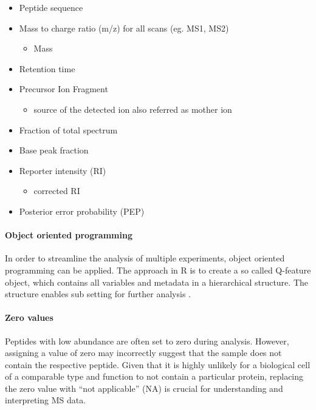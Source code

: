 \documentclass[
  11pt,
]{article}
\providecommand{\tightlist}{%
  \setlength{\itemsep}{0pt}\setlength{\parskip}{0pt}}
\begin{document}
\begin{itemize}
\tightlist
\item
  Peptide sequence
\item
  Mass to charge ratio (m/z) for all scans (eg. MS1, MS2)

  \begin{itemize}
  \tightlist
  \item
    Mass
  \end{itemize}
\item
  Retention time
\item
  Precursor Ion Fragment

  \begin{itemize}
  \tightlist
  \item
    source of the detected ion also referred as mother ion
  \end{itemize}
\item
  Fraction of total spectrum
\item
  Base peak fraction
\item
  Reporter intensity (RI)

  \begin{itemize}
  \tightlist
  \item
    corrected RI
  \end{itemize}
\item
  Posterior error probability (PEP)
\end{itemize}

\hypertarget{object-oriented-programming}{%
\paragraph{Object oriented
programming}\label{object-oriented-programming}}

In order to streamline the analysis of multiple experiments, object
oriented programming can be applied. The approach in R is to create a so
called Q-feature object, which contains all variables and metadata in a
hierarchical structure. The structure enables sub setting for further
analysis \citep{Vanderaa2021}.

\hypertarget{zero-values}{%
\paragraph{Zero values}\label{zero-values}}

Peptides with low abundance are often set to zero during analysis.
However, assigning a value of zero may incorrectly suggest that the
sample does not contain the respective peptide. Given that it is highly
unlikely for a biological cell of a comparable type and function to not
contain a particular protein, replacing the zero value with ``not
applicable'' (NA) is crucial for understanding and interpreting MS data.
\end{document}
